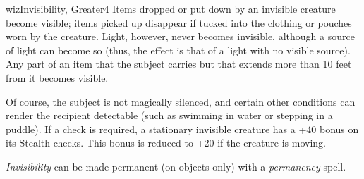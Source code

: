 \begin{spellcard}{wiz}{Invisibility, Greater}{4}
  Items dropped or put down by an invisible creature become visible; items
  picked up disappear if tucked into the clothing or pouches worn by the
  creature. Light, however, never becomes invisible, although a source of
  light can become so (thus, the effect is that of a light with no visible
  source). Any part of an item that the subject carries but that extends
  more than 10 feet from it becomes visible.

  Of course, the subject is not magically silenced, and certain other
  conditions can render the recipient detectable (such as swimming in
  water or stepping in a puddle). If a check is required, a stationary
  invisible creature has a +40 bonus on its Stealth checks. This bonus is
  reduced to +20 if the creature is moving.

  \emph{Invisibility} can be made permanent (on objects only) with a
  \emph{permanency} spell.

\end{spellcard}
